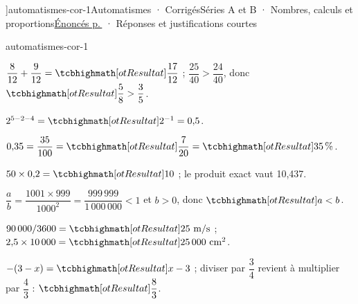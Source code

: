 \editionPage[\pdfbookmark[0]{Corrigés des automatismes}{bm-automatismes-cor-1-parent}]{automatismes-cor-1}{Automatismes · Corrigés}{Séries A et B · Nombres, calculs et proportions}{\hyperref[automatismes-1]{Énoncés p.\,\pageref*{automatismes-1}} · Réponses et justifications courtes}
\begin{blocEdition}{automatismes-cor-1}
\begin{deuxcolonnes}\begin{questions}
\item \begin{minipage}[t]{\linewidth}\raggedright\leavevmode {}\enspace $\dfrac8{12}+\dfrac9{12}=\res{\dfrac{17}{12}}$ ; $\dfrac{25}{40}>\dfrac{24}{40}$, donc $\res{\dfrac58>\dfrac35}$.\end{minipage}
\item \begin{minipage}[t]{\linewidth}\raggedright\leavevmode {}\enspace $2^{5-2-4}=\res{2^{-1}}=0{,}5$.\end{minipage}
\item \begin{minipage}[t]{\linewidth}\raggedright\leavevmode {}\enspace $0{,}35=\dfrac{35}{100}=\res{\dfrac7{20}}=\res{35\,\%}$.\end{minipage}
\item \begin{minipage}[t]{\linewidth}\raggedright\leavevmode {}\enspace $50\times0{,}2=\res{10}$ ; le produit exact vaut 10,437.\end{minipage}
\item \begin{minipage}[t]{\linewidth}\raggedright\leavevmode {}\enspace $\dfrac ab=\dfrac{1001\times999}{1000^2}=\dfrac{999\,999}{1\,000\,000}<1$ et $b>0$, donc $\res{a<b}$.\end{minipage}
\item \begin{minipage}[t]{\linewidth}\raggedright\leavevmode {}\enspace $90\,000/3600=\res{25\text{ m/s}}$ ; $2{,}5\times10\,000=\res{25\,000\text{ cm}^2}$.\end{minipage}
\item \begin{minipage}[t]{\linewidth}\raggedright\leavevmode {}\enspace $-(3-x)=\res{x-3}$ ; diviser par $\dfrac34$ revient à multiplier par $\dfrac43$ : $\res{\dfrac83}$.\end{minipage}

\end{questions}
\end{deuxcolonnes}
\end{blocEdition}
